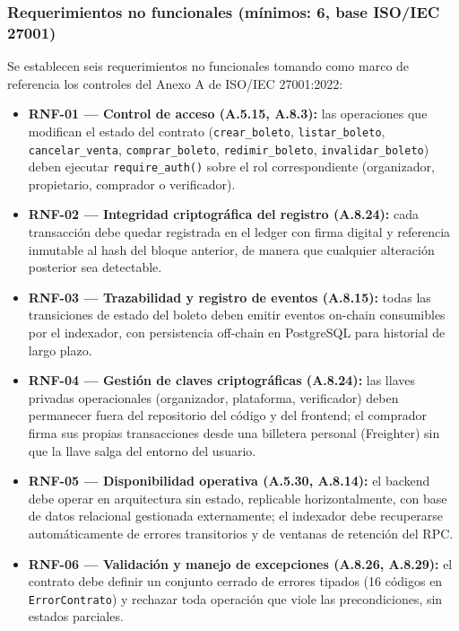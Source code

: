 \subsubsection{Requerimientos no funcionales (mínimos: 6, base ISO/IEC 27001)}

Se establecen seis requerimientos no funcionales tomando como marco de referencia los controles del Anexo A de ISO/IEC 27001:2022:

\begin{itemize}
    \item \textbf{RNF-01 — Control de acceso (A.5.15, A.8.3):} las operaciones que modifican el estado del contrato (\texttt{crear\_boleto}, \texttt{listar\_boleto}, \texttt{cancelar\_venta}, \texttt{comprar\_boleto}, \texttt{redimir\_boleto}, \texttt{invalidar\_boleto}) deben ejecutar \texttt{require\_auth()} sobre el rol correspondiente (organizador, propietario, comprador o verificador).
    \item \textbf{RNF-02 — Integridad criptográfica del registro (A.8.24):} cada transacción debe quedar registrada en el ledger con firma digital y referencia inmutable al hash del bloque anterior, de manera que cualquier alteración posterior sea detectable.
    \item \textbf{RNF-03 — Trazabilidad y registro de eventos (A.8.15):} todas las transiciones de estado del boleto deben emitir eventos on-chain consumibles por el indexador, con persistencia off-chain en PostgreSQL para historial de largo plazo.
    \item \textbf{RNF-04 — Gestión de claves criptográficas (A.8.24):} las llaves privadas operacionales (organizador, plataforma, verificador) deben permanecer fuera del repositorio del código y del frontend; el comprador firma sus propias transacciones desde una billetera personal (Freighter) sin que la llave salga del entorno del usuario.
    \item \textbf{RNF-05 — Disponibilidad operativa (A.5.30, A.8.14):} el backend debe operar en arquitectura sin estado, replicable horizontalmente, con base de datos relacional gestionada externamente; el indexador debe recuperarse automáticamente de errores transitorios y de ventanas de retención del RPC.
    \item \textbf{RNF-06 — Validación y manejo de excepciones (A.8.26, A.8.29):} el contrato debe definir un conjunto cerrado de errores tipados (16 códigos en \texttt{ErrorContrato}) y rechazar toda operación que viole las precondiciones, sin estados parciales.
\end{itemize}

